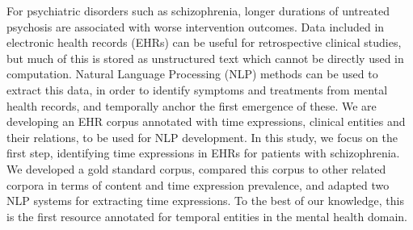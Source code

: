 For psychiatric disorders such as schizophrenia, longer durations of untreated psychosis are associated with worse intervention outcomes. Data included in electronic health records (EHRs) can be useful for retrospective clinical studies, but much of this is stored as unstructured text which cannot be directly used in computation. Natural Language Processing (NLP) methods can be used to extract this data, in order to identify symptoms and treatments from mental health records, and temporally anchor the first emergence of these. We are developing an EHR corpus annotated with time expressions, clinical entities and their relations, to be used for NLP development. In this study, we focus on the first step, identifying time expressions in EHRs for patients with schizophrenia. We developed a gold standard corpus, compared this corpus to other related corpora in terms of content and time expression prevalence, and adapted two NLP systems for extracting time expressions. To the best of our knowledge, this is the first resource annotated for temporal entities in the mental health domain.
